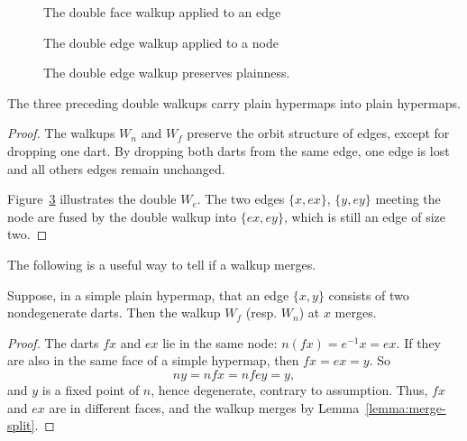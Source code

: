 \begin{figure}[htb]
  \centering
  \caption{The double face walkup applied to an edge}
  \label{fig:doubleface}
\end{figure}


\begin{figure}[htb]
  \centering
  \caption{The double edge walkup applied to a node}
  \label{fig:doubleedge}
\end{figure}

\begin{figure}[htb]
  \centering
  \caption{The double edge walkup preserves plainness.}
  \label{fig:doubleplain}
\end{figure}


\begin{lemma}  
The three preceding double walkups carry plain
hypermaps into plain hypermaps.
\end{lemma}

\begin{proof} The walkups $W_n$ and $W_f$ preserve the orbit structure of edges, except for dropping one dart.  By dropping both darts from the same edge, one edge is lost and all others edges remain unchanged.

Figure~\ref{fig:doubleplain} illustrates the double $W_e$.  The two edges $\{x,e x\}$, $\{y, e y\}$ meeting the node are fused by the double walkup into $\{e x, e y\}$, which is still an edge of size two.
\end{proof}

The following is a useful way to tell if a walkup merges.


\begin{lemma}  
Suppose, in a simple plain hypermap, that an edge $\{x,y\}$ consists of two nondegenerate darts.  Then the walkup  $W_f$ (resp. $W_n$) at $x$  merges.
\end{lemma}

\begin{proof} 
The darts $f x$ and $e x$ lie in the same node: $n (f x) = e^{-1} x = e x$. If they are also in the same face of a simple hypermap, then $f x = e x
= y$. So 
  $$n y  = n f x = n f e y = y,$$
and $y$ is a fixed
point of $n$, hence degenerate, contrary to assumption.  
Thus, $f x$ and $e x$ are in different faces, and the walkup merges
by Lemma~\ref{lemma:merge-split}.  
\end{proof}




